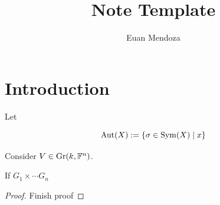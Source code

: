 \documentclass[12pt]{article}
\title{
  Note Template
}
\author{
  Euan Mendoza
}
\begin{document}
\maketitle

\section{Introduction}

Let

\[
    \mathrm{Aut}(X) := \{ \sigma \in \mathrm{Sym}(X)\mid x\}
\]

Consider $V\in \mathrm{Gr}(k,\mathbb{F}^{n})$.

\begin{theorem}
    If $G_{1}\times \cdots G_{n}$
\end{theorem}

\begin{proof}
    Finish proof
\end{proof}
\end{document}
